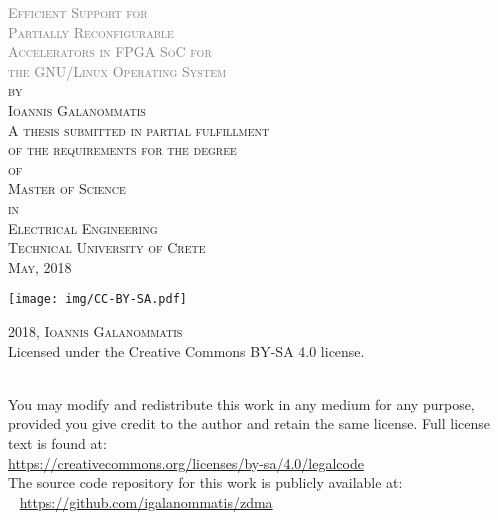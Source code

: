 \thispagestyle{empty}
\begin{center}
	\textsc{
	\textcolor{gray} {\LARGE
		Efficient Support for \\
		Partially Reconfigurable\\
		Accelerators in FPGA SoC for\\
		the GNU/Linux Operating System\\
	}
	\vspace{50pt}
	by\\
	\vspace{20pt}
	\large Ioannis Galanommatis\\
	\vspace{80pt}
		A thesis submitted in partial fulfillment\\
		of the requirements for the degree\\
		\vspace{12pt}
		of\\
		\vspace{12pt}
		{\large Master of Science\\}
		\vspace{12pt}
		in\\
		\vspace{12pt}
		{\large Electrical Engineering\\}
	}
	\vspace*{\fill}
	\textsc{\large Technical University of Crete\\May, 2018\\}
	
\end{center}

\newpage

\thispagestyle{empty}
\vspace*{\fill}
\noindent
\begin{minipage}{0.2\textwidth}
\noindent \texttt{[image: img/CC-BY-SA.pdf]}
\end{minipage}\hfill
\begin{minipage}{0.8\textwidth}
{\scshape 2018, Ioannis Galanommatis\\}
\rmfamily\textup{Licensed under the Creative Commons BY-SA 4.0 license.}
\end{minipage}
\medskip\\
You may modify and redistribute this work in any medium for any purpose,
provided you give credit to the author and retain the same license.
Full license text is found at:\\
\url{https://creativecommons.org/licenses/by-sa/4.0/legalcode}
\vspace*{\fill}
\\
The source code repository for this work is publicly available at:\\
\faGithub ~ \url{https://github.com/igalanommatis/zdma}
